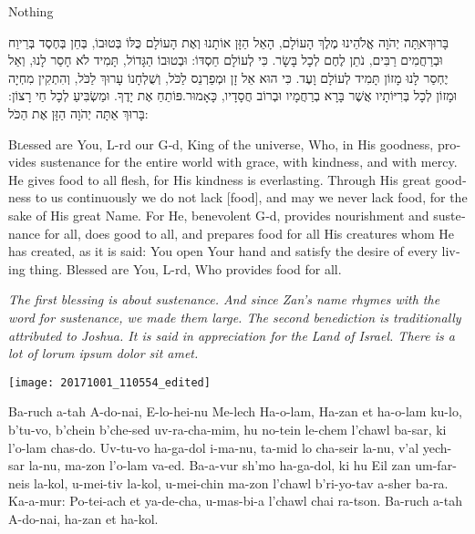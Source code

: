 \documentclass[a5paper, 12pt]{book}
\begin{document}
Nothing

\eject

\lettrine[lines=2, depth=1, findent=1.5em]{בָּרוּךְ} אַתָּה יְהֹוָה אֱלֹהֵינוּ מֶלֶךְ הָעוֹלָם, הָאֵל {\LARGE הַזָּן }אוֹתָנוּ וְאֶת  הָעוֹלָם כֻּלּוֹ בְּטוּבוֹ, בְּחֵן בְּחֶסֶד בְּרֵיוַח וּבְרַחֲמִים רַבִּים, נֹתֵן לֶחֶם לְכָל בָּשָׂר. כִּי לְעוֹלָם חַסְדּוֹ: וּבְטוּבוֹ הַגָּדוֹל, תָּמִיד לֹא חָסַר לָנוּ, וְאַל יֶחְסַר לָנוּ מָזוֹן תָּמִיד לְעוֹלָם וָעֶד. כִּי הוּא אֵל {\LARGE זָן } וּמְפַרְנֵס לַכֹּל, וְשֻׁלְחָנוֹ עָרוּךְ לַכֹּל, וְהִתְקִין מִחְיָה וּמָזוֹן לְכָל בְּרִיּוֹתָיו אֲשֶׁר בָּרָא בְרַחֲמָיו וּבְרוֹב חֲסָדָיו, כָּאָמוּר.פּוֹתֵחַ אֶת יָדֶךָ. וּמַשְׂבִּיעַ לְכָל חַי רָצוֹן: בָּרוּךְ אַתָּה יְהֹוָה  {\LARGE הַזָּן }אֶת הַכֹּל:

\begin{english}
\lettrine{B}lessed are You, L-rd our G‑d, King of the universe, Who, in His goodness, provides sustenance for the entire world with grace, with kindness, and with mercy. He gives food to all flesh, for His kindness is everlasting. Through His great goodness to us continuously we do not lack [food], and may we never lack food, for the sake of His great Name. For He, benevolent G‑d, provides nourishment and sustenance for all, does good to all, and prepares food for all His creatures whom He has created, as it is said: You open Your hand and satisfy the desire of every living thing. Blessed are You, L-rd, Who provides food for all.

\textit{
The first blessing is about sustenance. And since Zan's name rhymes with the word for sustenance, we made them large. The second benediction is traditionally attributed to Joshua. It is said in appreciation for the Land of Israel. There is a lot of lorum ipsum dolor sit amet.
}

\end{english}

\eject

\begin{center}
\texttt{[image: 20171001\_110554\_edited]}
\end{center}

\begin{english}
Ba-ruch a-tah A-do-nai, E-lo-hei-nu Me-lech Ha-o-lam,
Ha-zan et ha-o-lam ku-lo, b'tu-vo,
b'chein b'che-sed uv-ra-cha-mim,
hu no-tein le-chem l'chawl ba-sar, ki l'o-lam chas-do.
Uv-tu-vo ha-ga-dol i-ma-nu, ta-mid lo cha-seir la-nu,
v'al yech-sar la-nu, ma-zon l'o-lam va-ed.
Ba-a-vur sh'mo ha-ga-dol, ki hu Eil zan um-far-neis la-kol,
u-mei-tiv la-kol, u-mei-chin ma-zon
l'chawl b'ri-yo-tav a-sher ba-ra.
Ka-a-mur: Po-tei-ach et ya-de-cha, u-mas-bi-a l'chawl chai ra-tson.
Ba-ruch a-tah A-do-nai, ha-zan et ha-kol.

\end{english}
\end{document}
